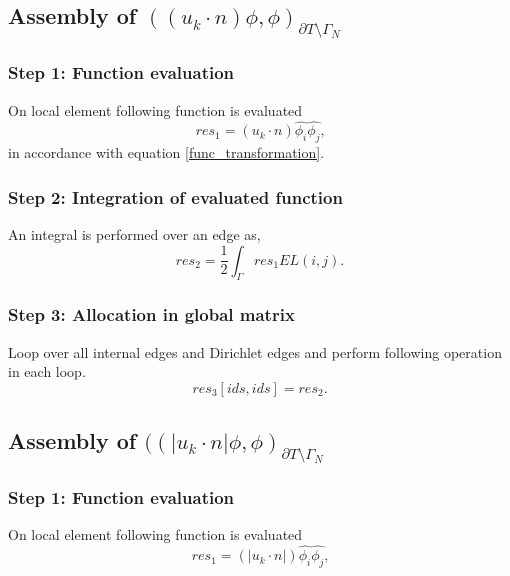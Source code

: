 \documentclass[a4paper,twoside,openright]{book}
\begin{document}
\subsection{Assembly of $((u_k \cdot n)\phi,\phi)_{\partial T \setminus \Gamma_N}$}

\subsubsection{Step 1: Function evaluation}

On local element following function is evaluated 
\begin{equation}
res_1 = (u_k \cdot n) \hat{\phi_i} \hat{\phi_j} \textrm{,}
\end{equation} 
in accordance with equation \eqref{func_transformation}.\\

\subsubsection{Step 2: Integration of evaluated function}

An integral is performed over an edge as,
\begin{equation}
res_2 = \frac{1}{2} \int_{\Gamma} res_1 EL(i,j) \textrm{.}
\end{equation}

\subsubsection{Step 3: Allocation in global matrix}

Loop over all internal edges and Dirichlet edges and perform following operation in each loop.
\begin{equation}
res_3[ids,ids] = res_2 \textrm{.}
\end{equation}

\subsection{Assembly of $((|u_k \cdot n| \phi,\phi)_{\partial T \setminus \Gamma_N}$}

\subsubsection{Step 1: Function evaluation}

On local element following function is evaluated 
\begin{equation}
res_1 = (|u_k \cdot n|) \hat{\phi_i} \hat{\phi_j} \textrm{,}
\end{equation}
\end{document}
